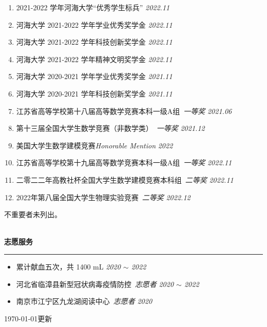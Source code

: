 \documentclass[12pt]{article}
\newcommand{\sect}[1]{
    ~\\ \noindent \textbf{#1} \medskip \hrule \medskip
}
\begin{document}
\begin{enumerate}
    \item 2021-2022 学年河海大学“优秀学生标兵” \hfill \textit{2022.11}
    \item 河海大学 2021-2022 学年学业优秀奖学金 \hfill \textit{2022.11}
    \item 河海大学 2021-2022 学年科技创新奖学金 \hfill \textit{2022.11}
    \item 河海大学 2021-2022 学年精神文明奖学金 \hfill \textit{2022.11}
    \item 河海大学 2020-2021 学年学业优秀奖学金 \hfill \textit{2021.11}
    \item 河海大学 2020-2021 学年科技创新奖学金 \hfill \textit{2021.11}
          \\
    \item 江苏省高等学校第十八届高等数学竞赛本科一级A组\ \textit{一等奖} \hfill \textit{2021.06}
    \item 第十三届全国大学生数学竞赛（非数学类）\ \textit{一等奖} \hfill \textit{2021.12}
    \item 美国大学生数学建模竞赛\textit{Honorable Mention} \hfill \textit{2022}
    \item 江苏省高等学校第十九届高等数学竞赛本科一级A组\ \textit{一等奖} \hfill \textit{2022.11}
    \item 二零二二年高教社杯全国大学生数学建模竞赛本科组\ \textit{二等奖} \hfill \textit{2022.11}
    \item 2022年第八届全国大学生物理实验竞赛\ \textit{二等奖}  \hfill \textit{2022.12}
\end{enumerate}

\hfill {\tiny 不重要者未列出。}


\sect{志愿服务}

\begin{itemize}[noitemsep,nolistsep]
    \item 累计献血五次，共 1400 mL \hfill \textit{2020 $\sim$ 2022}
    \item 河北省临漳县新型冠状病毒疫情防控\ \textit{志愿者} \hfill \textit{2020 $\sim$ 2022}
    \item 南京市江宁区九龙湖阅读中心\ \textit{志愿者} \hfill \textit{2020}
\end{itemize}

\hfill {\tiny \today 更新}
\end{document}
